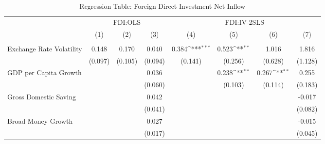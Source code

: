 \begin{table}[H] \def\sym#1{\ifmmode^{#1}\else\(^{#1}\)\fi} \caption{Regression Table: Foreign Direct Investment Net Inflow} \begin{adjustbox}{max width=\textwidth} \begin{tabular}{l*{7}{c}} \\ \hline\hline
            &\multicolumn{3}{c}{FDI:OLS}                                      &\multicolumn{4}{c}{FDI:IV-2SLS}                                                        \\\cmidrule(lr){2-4}\cmidrule(lr){5-8}
            &\multicolumn{1}{c}{(1)}         &\multicolumn{1}{c}{(2)}         &\multicolumn{1}{c}{(3)}         &\multicolumn{1}{c}{(4)}         &\multicolumn{1}{c}{(5)}         &\multicolumn{1}{c}{(6)}         &\multicolumn{1}{c}{(7)}         \\
\hline \addlinespace \multicolumn{7}{l}{} \\  \addlinespace[2pt]
Exchange Rate Volatility&       0.148         &       0.170         &       0.040         &       0.384\sym{***}&       0.523\sym{**} &       1.016         &       1.816         \\
            &     (0.097)         &     (0.105)         &     (0.094)         &     (0.141)         &     (0.256)         &     (0.628)         &     (1.128)         \\
\addlinespace
GDP per Capita Growth&                     &                     &       0.036         &                     &       0.238\sym{**} &       0.267\sym{**} &       0.255         \\
            &                     &                     &     (0.060)         &                     &     (0.103)         &     (0.114)         &     (0.183)         \\
\addlinespace
Gross Domestic Saving&                     &                     &       0.042         &                     &                     &                     &      -0.017         \\
            &                     &                     &     (0.041)         &                     &                     &                     &     (0.082)         \\
\addlinespace
Broad Money Growth&                     &                     &       0.027         &                     &                     &                     &      -0.015         \\
            &                     &                     &     (0.017)         &                     &                     &                     &     (0.045)         \\

\end{tabular}
\end{adjustbox}
\end{table}
